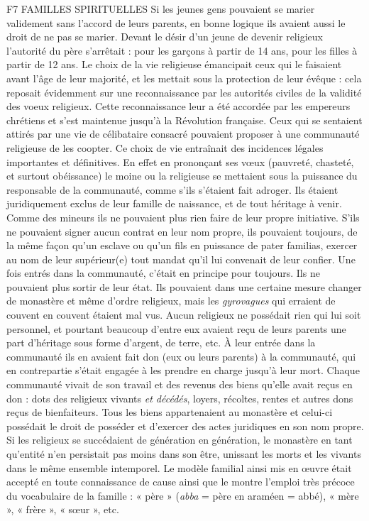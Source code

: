 F7 FAMILLES SPIRITUELLES
 Si les jeunes gens pouvaient se marier validement sans l'accord de leurs parents, en bonne logique ils avaient aussi le droit de ne pas se marier. Devant le désir d'un jeune de devenir religieux l'autorité du père s'arrêtait : pour les garçons à partir de 14 ans, pour les filles à partir de 12 ans. Le choix de la vie religieuse émancipait ceux qui le faisaient avant l'âge de leur majorité, et les mettait sous la protection de leur évêque : cela reposait évidemment sur une reconnaissance par les autorités civiles de la validité des voeux religieux. Cette reconnaissance leur a été accordée par les empereurs chrétiens et s'est maintenue jusqu'à la Révolution française.
 Ceux qui se sentaient attirés par une vie de célibataire consacré pouvaient proposer à une communauté religieuse de les coopter. Ce choix de vie entraînait des incidences légales importantes et définitives. En effet en prononçant ses vœux (pauvreté, chasteté, et surtout obéissance) le moine ou la religieuse se mettaient sous la puissance du responsable de la communauté, comme s'ils s'étaient fait adroger. Ils étaient juridiquement exclus de leur famille de naissance, et de tout héritage à venir. Comme des mineurs ils ne pouvaient plus rien faire de leur propre initiative. S'ils ne pouvaient signer aucun contrat en leur nom propre, ils pouvaient toujours, de la même façon qu'un esclave ou qu'un fils en puissance de pater familias, exercer au nom de leur supérieur(e) tout mandat qu'il lui convenait de leur confier. Une fois entrés dans la communauté, c'était en principe pour toujours. Ils ne pouvaient plus sortir de leur état. Ils pouvaient dans une certaine mesure changer de monastère et même d'ordre religieux, mais les \emph{gyrovagues} qui erraient de couvent en couvent étaient mal vus. 
 Aucun religieux ne possédait rien qui lui soit personnel, et pourtant beaucoup d'entre eux avaient reçu de leurs parents une part d'héritage sous forme d'argent, de terre, etc. À leur entrée dans la communauté ils en avaient fait don (eux ou leurs parents) à la communauté, qui en contrepartie s'était engagée à les prendre en charge jusqu'à leur mort. Chaque communauté vivait de son travail et des revenus des biens qu'elle avait reçus en don : dots des religieux vivants \emph{et décédés}, loyers, récoltes, rentes et autres dons reçus de bienfaiteurs. Tous les biens appartenaient au monastère et celui-ci possédait le droit de posséder et d'exercer des actes juridiques en son nom propre. Si les religieux se succédaient de génération en génération, le monastère en tant qu'entité n'en persistait pas moins dans son être, unissant les morts et les vivants dans le même ensemble intemporel. Le modèle familial ainsi mis en œuvre était accepté en toute connaissance de cause ainsi que le montre l'emploi très précoce du vocabulaire de la famille : « père » (\emph{abba} = père en araméen = abbé), « mère », « frère », « sœur », etc. 
